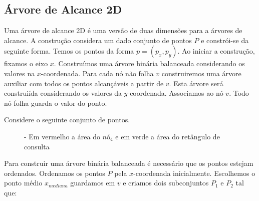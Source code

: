 \subsection{Árvore de Alcance 2D}

Uma árvore de alcance 2D é uma versão de duas dimensões para a árvores de alcance. A construção considera
um dado conjunto de pontos $P$ e constrói-se da seguinte forma.
Temos os pontos da forma $p = (p_x, p_y)$. Ao iniciar a construção, fixamos o eixo $x$.
Construímos uma árvore binária balanceada considerando os valores na $x$-coordenada. Para cada nó não
folha $v$ construiremos uma árvore auxiliar \tau com todos os pontos alcançáveis a partir de $v$. Esta
árvore será construiída considerando os valores da $y$-coordenada. Associamos \tau ao nó $v$.
Todo nó folha guarda o valor do ponto.

Considere o seguinte conjunto de pontos.
\begin{figure}[H]
    \caption{\label{fig:Fig_34} - Em vermelho a área do $nó_4$ e em verde a área do retângulo de consulta}
\centering


\end{figure}

Para construir uma árvore binária balanceada é necessário que os pontos estejam ordenados.
Ordenamos os pontos $P$ pela $x$-coordenada inicialmente. Escolhemos o ponto médio $x_{mediana}$ guardamos
em $v$ e criamos dois subconjuntos $P_1$ e $P_2$ tal que:

